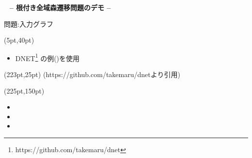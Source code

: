 \begin{frame}{~}
\centering \Large
\textbf{-- 根付き全域森遷移問題のデモ --}
\end{frame}
\begin{frame}{問題:入力グラフ}
  \renewcommand{\thefootnote}{\fnsymbol{footnote}}
  \setcounter{footnote}{1}
\begin{textblock*}{\linewidth}(5pt,40pt)
\begin{itemize}
 \item DNET\footnote{https://github.com/takemaru/dnet}
	   \!の例()を使用
\end{itemize} 
\end{textblock*}\vfill
\begin{textblock*}{0.4\linewidth}(223pt,25pt)
 \centering
 {\tiny(https://github.com/takemaru/dnetより引用)}
\end{textblock*}\vfill
\scalebox{0.75}{}
\begin{textblock*}{0.4\linewidth}(225pt,150pt)
\begin{itemize}
 \item {}
 \item {}
 \item {}
\end{itemize}
\end{textblock*}\vfill
\end{frame}
